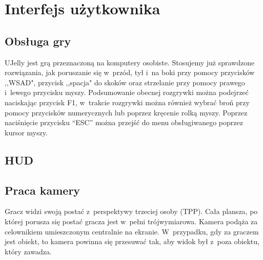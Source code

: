 \chapter{Interfejs użytkownika}

\section{Obsługa gry}
UJelly jest grą przeznaczoną na komputery osobiste. Stosujemy już sprawdzone rozwiązania, jak poruszanie się w~przód, tył i~na boki przy pomocy przycisków ,,WSAD", przycisk ,,spacja" do skoków oraz strzelanie przy pomocy prawego i~lewego przycisku myszy. 
Podsumowanie obecnej rozgrywki można podejrzeć naciskając przycisk F1, w~trakcie rozgrywki można również wybrać broń przy pomocy przycisków numerycznych lub poprzez kręcenie rolką myszy. Poprzez naciśnięcie przycisku “ESC” można przejść do menu obsługiwanego poprzez kursor myszy.

\section{HUD}

\section{Praca kamery}
Gracz widzi swoją postać z~perspektywy trzeciej osoby (TPP). Cała plansza, po której porusza się postać gracza jest w~pełni trójwymiarowa. Kamera podąża za celownikiem umieszczonym centralnie na ekranie. W~przypadku, gdy za graczem jest obiekt, to kamera powinna się przesuwać tak, aby widok był z~poza obiektu, który zawadza.

